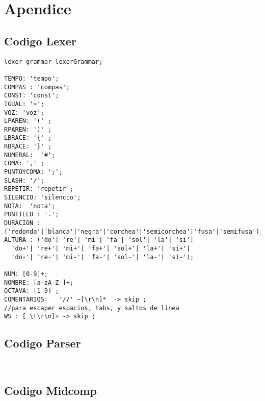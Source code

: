 \section{Apendice}

\subsection{Codigo Lexer}
\begin{verbatim}
lexer grammar lexerGrammar;

TEMPO: 'tempo';
COMPAS : 'compas';
CONST: 'const';
IGUAL: '=';
VOZ: 'voz';
LPAREN: '(' ;
RPAREN: ')' ;
LBRACE: '{' ;
RBRACE: '}' ;
NUMERAL:  '#';
COMA: ',' ;
PUNTOYCOMA: ';';
SLASH: '/';
REPETIR: 'repetir';
SILENCIO: 'silencio';
NOTA:  'nota';
PUNTILLO : '.';
DURACION : ('redonda'|'blanca'|'negra'|'corchea'|'semicorchea'|'fusa'|'semifusa');
ALTURA : ('do'| 're'| 'mi'| 'fa'| 'sol'| 'la'| 'si'|
  'do+'| 're+'| 'mi+'| 'fa+'| 'sol+'| 'la+'| 'si+'|
  'do-'| 're-'| 'mi-'| 'fa-'| 'sol-'| 'la-'| 'si-');

NUM: [0-9]+;
NOMBRE: [a-zA-Z_]+;
OCTAVA: [1-9] ;
COMENTARIOS:   '//' ~[\r\n]*  -> skip ;
//para escaper espacios, tabs, y saltos de linea
WS : [ \t\r\n]+ -> skip ;
\end{verbatim}

\subsection{Codigo Parser}

\begin{verbatim}
 
\end{verbatim}


\subsection{Codigo Midcomp}

